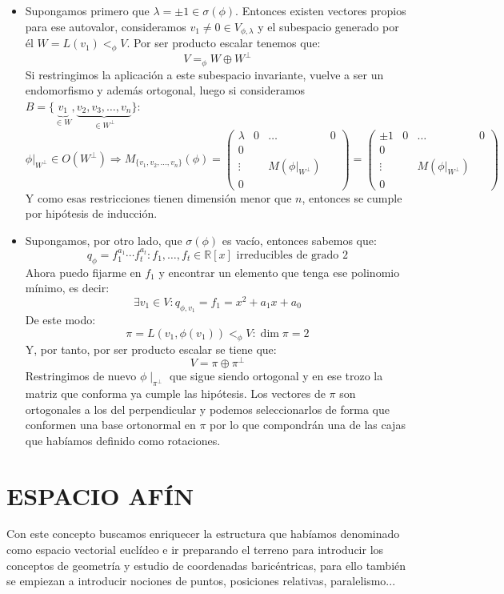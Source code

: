 \documentclass[10pt,a4paper,openright]{book}
\theoremstyle{break}
\begin{document}
\begin{itemize}
\item Supongamos primero que $\lambda = \pm 1 \in \sigma(\phi)$. Entonces existen vectores propios para ese autovalor, consideramos $v_1 \neq 0 \in V_{\phi, \lambda}$ y el subespacio generado por él $W = L(v_1) <_\phi V$. Por ser producto escalar tenemos que:
$$V =_\phi W \oplus W^\perp$$
Si restringimos la aplicación a este subespacio invariante, vuelve a ser un endomorfismo y además ortogonal, luego si consideramos $B=\{\underbrace{v_1}_{\in W}, \underbrace{v_2, v_3, \ldots, v_n}_{\in W^\perp}\}$:
$$\phi|_{W^\perp}\in O(W^\perp)\Rightarrow M_{\{v_1,v_2,\ldots , v_n\}} (\phi) =
\left(
\begin{array}{c|ccc}
\lambda & 0 & \ldots & 0 \\
\hline
0  & & &  \\
\vdots & & M(\phi|_{W^\perp}) & \\
0 & & &
\end{array}
\right) = \left(
\begin{array}{c|ccc}
\pm 1 & 0 & \ldots & 0 \\
\hline
0  & & &  \\
\vdots & & M(\phi|_{W^\perp}) & \\
0 & & &
\end{array}
\right) $$
Y como esas restricciones tienen dimensión menor que $n$, entonces se cumple  por hipótesis de inducción.

\item Supongamos, por otro lado, que $\sigma (\phi)$ es vacío, entonces sabemos que:
$$q_\phi = f_1^{a_1} \cdots f_t^{a_t}: f_1, \ldots, f_t \in \mathbb{R}[x] \mbox{ irreducibles de grado } 2$$
Ahora puedo fijarme en $f_{1}$ y encontrar un elemento que tenga ese polinomio mínimo, es decir:
$$\exists v_1\in V: q_{\phi, v_1} = f_1 = x^2+a_1x+a_0$$
De este modo:
$$\pi = L(v_1, \phi(v_1))<_\phi V: \dim \pi = 2$$
Y, por tanto, por ser producto escalar se tiene que:
$$V = \pi \oplus \pi^\perp$$
Restringimos de nuevo $\phi\mid_{\pi^\perp}$ que sigue siendo ortogonal y en ese trozo la matriz que conforma ya cumple las hipótesis. Los vectores de $\pi$ son ortogonales a los del perpendicular y podemos seleccionarlos de forma que conformen una base ortonormal en $\pi$ por lo que compondrán una de las cajas que habíamos definido como rotaciones.
\end{itemize}

\chapter*{ESPACIO AFÍN}
Con este concepto buscamos enriquecer la estructura que habíamos denominado como espacio vectorial euclídeo e ir preparando el terreno para introducir los conceptos de geometría y estudio de coordenadas baricéntricas, para ello también se empiezan a introducir nociones de puntos, posiciones relativas, paralelismo...
\end{document}
